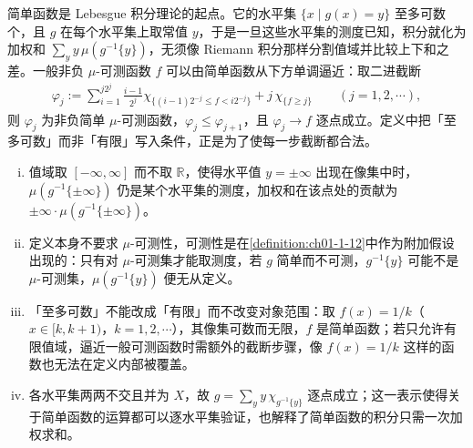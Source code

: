 \documentclass[../../main.tex]{subfiles}%
\begin{document}
\begin{remark}\label{remark:ch01-def-1-11-动机}
简单函数是 Lebesgue 积分理论的起点。它的水平集 $\{x\mid g(x)=y\}$ 至多可数个，且 $g$ 在每个水平集上取常值 $y$，于是一旦这些水平集的测度已知，积分就化为加权和 $\sum_{y}y\,\mu(g^{-1}\{y\})$，无须像 Riemann 积分那样分割值域并比较上下和之差。一般非负 $\mu$-可测函数 $f$ 可以由简单函数从下方单调逼近：取二进截断
\begin{align*}
\varphi_j:=\sum_{i=1}^{j2^{j}}\frac{i-1}{2^{j}}\chi_{\{(i-1)2^{-j}\leqslant f<i2^{-j}\}}+j\,\chi_{\{f\geqslant j\}}\qquad(j=1,2,\cdots),
\end{align*}
则 $\varphi_j$ 为非负简单 $\mu$-可测函数，$\varphi_j\leqslant\varphi_{j+1}$，且 $\varphi_j\to f$ 逐点成立。定义中把「至多可数」而非「有限」写入条件，正是为了使每一步截断都合法。
\end{remark}

\begin{remark}\label{remark:ch01-def-1-11-条件}
\begin{enumerate}[(i)]
\item 值域取 $[-\infty,\infty]$ 而不取 $\mathbb{R}$，使得水平值 $y=\pm\infty$ 出现在像集中时，$\mu(g^{-1}\{\pm\infty\})$ 仍是某个水平集的测度，加权和在该点处的贡献为 $\pm\infty\cdot\mu(g^{-1}\{\pm\infty\})$。
\item 定义本身不要求 $\mu$-可测性，可测性是在\cref{definition:ch01-1-12}中作为附加假设出现的：只有对 $\mu$-可测集才能取测度，若 $g$ 简单而不可测，$g^{-1}\{y\}$ 可能不是 $\mu$-可测集，$\mu(g^{-1}\{y\})$ 便无从定义。%
\item 「至多可数」不能改成「有限」而不改变对象范围：取 $f(x)=1/k$（$x\in[k,k+1)$，$k=1,2,\cdots$），其像集可数而无限，$f$ 是简单函数；若只允许有限值域，逼近一般可测函数时需额外的截断步骤，像 $f(x)=1/k$ 这样的函数也无法在定义内部被覆盖。
\item 各水平集两两不交且并为 $X$，故 $g=\sum_{y}y\,\chi_{g^{-1}\{y\}}$ 逐点成立；这一表示使得关于简单函数的运算都可以逐水平集验证，也解释了简单函数的积分只需一次加权求和。
\end{enumerate}
\end{remark}
\end{document}
